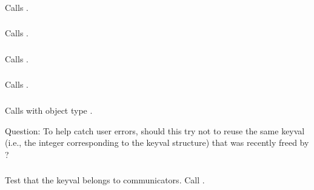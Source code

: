 \documentclass{article}
\begin{document}
\subsubsection{}
Calls .

\subsubsection{}
Calls .

\subsubsection{}
Calls .

\subsubsection{}
Calls .

\subsubsection{}
Calls  with object type
. 

Question: To help catch user errors, should this try not to reuse the
same keyval (i.e., the integer corresponding to the keyval structure)
that was recently freed by ?

\subsubsection{}
Test that the keyval belongs to communicators.  Call
. 


\end{document}
